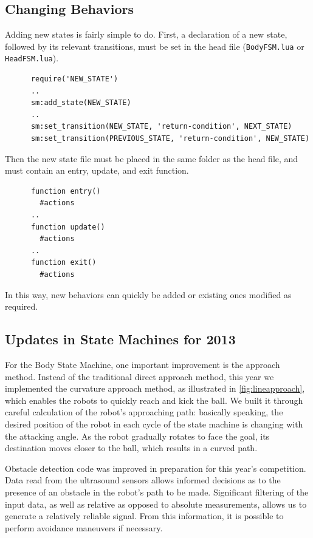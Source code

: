 \documentclass{article}
\begin{document}
	\subsection{Changing Behaviors}
		Adding new states is fairly simple to do. First, a declaration of a new state, followed by its relevant transitions, must be set in the head file (\texttt{BodyFSM.lua} or \texttt{HeadFSM.lua}).
	  \begin{lstlisting}
      require('NEW_STATE')
      ..
      sm:add_state(NEW_STATE)
      ..
      sm:set_transition(NEW_STATE, 'return-condition', NEXT_STATE)
      sm:set_transition(PREVIOUS_STATE, 'return-condition', NEW_STATE)
	  \end{lstlisting}
		Then the new state file must be placed in the same folder as the head file, and must contain an entry, update, and exit function.
	  \begin{lstlisting}
      function entry()
	    #actions
      ..
      function update()
	    #actions
      ..
      function exit()
	    #actions
	  \end{lstlisting}
	  In this way, new behaviors can quickly be added or existing ones modified as required.

  \subsection{Updates in State Machines for 2013}
    For the Body State Machine, one important improvement is the approach method. Instead of the traditional direct approach method, this year we implemented the curvature approach method, as illustrated in \ref{fig:lineapproach}, which enables the robots to quickly reach and kick the ball. We built it through careful calculation of the robot's approaching path: basically speaking, the desired position of the robot in each cycle of the state machine is changing with the attacking angle. As the robot gradually rotates to face the goal, its destination moves closer to the ball, which results in a curved path.  
 
  	Obstacle detection code was improved in preparation for this year’s competition. Data read from the ultrasound sensors allows informed decisions as to the presence of an obstacle in the robot’s path to be made. Significant filtering of the input data, as well as relative as opposed to absolute measurements, allows us to generate a relatively reliable signal. From this information, it is possible to perform avoidance maneuvers if necessary.
   
\end{document}
